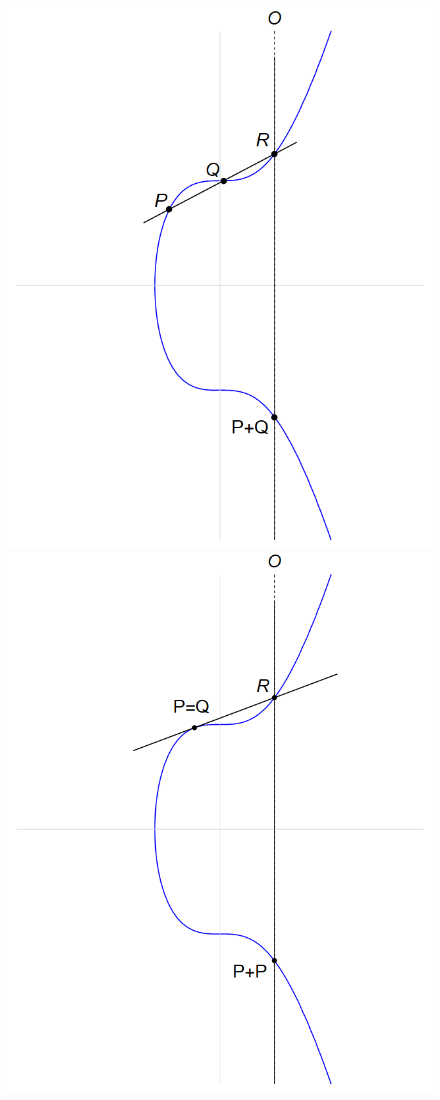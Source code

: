 \begin{figure}
\begin{minipage}[t]{0.3\textwidth}
	\includegraphics[width=\textwidth]{figuras/suma_eliptica_1}
\end{minipage}
\begin{minipage}[t]{0.3\textwidth}
	\includegraphics[width=\textwidth]{figuras/suma_eliptica_2}

\end{minipage}
\end{figure}

